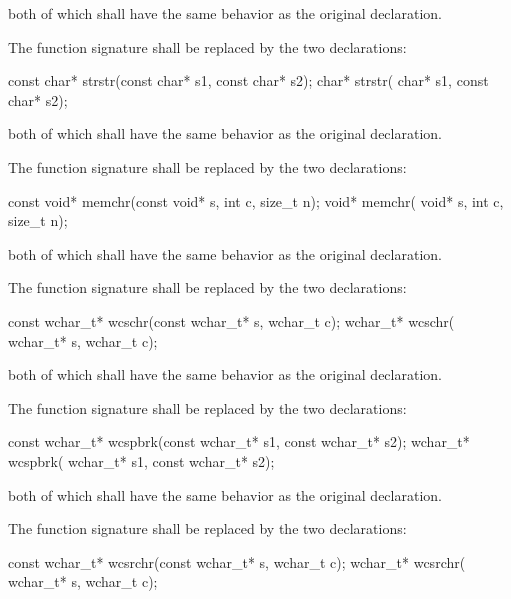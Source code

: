 both of which shall have the same behavior as the original declaration.

\pnum
{}%
The function signature
shall be replaced by the two declarations:

\begin{codeblock}
const char* strstr(const char* s1, const char* s2);
      char* strstr(      char* s1, const char* s2);
\end{codeblock}

both of which shall have the same behavior as the original declaration.

\pnum
{}%
The function signature
shall be replaced by the two declarations:

\begin{codeblock}
const void* memchr(const void* s, int c, size_t n);
      void* memchr(      void* s, int c, size_t n);
\end{codeblock}

both of which shall have the same behavior as the original declaration.

\pnum
{}%
The function signature
shall be replaced by the two declarations:

\begin{codeblock}
const wchar_t* wcschr(const wchar_t* s, wchar_t c);
      wchar_t* wcschr(      wchar_t* s, wchar_t c);
\end{codeblock}

both of which shall have the same behavior as the original declaration.

\pnum
{}%
The function signature
shall be replaced by the two declarations:

\begin{codeblock}
const wchar_t* wcspbrk(const wchar_t* s1, const wchar_t* s2);
      wchar_t* wcspbrk(      wchar_t* s1, const wchar_t* s2);
\end{codeblock}

both of which shall have the same behavior as the original declaration.

\pnum
{}%
The function signature
shall be replaced by the two declarations:

\begin{codeblock}
const wchar_t* wcsrchr(const wchar_t* s, wchar_t c);
      wchar_t* wcsrchr(      wchar_t* s, wchar_t c);
\end{codeblock}


